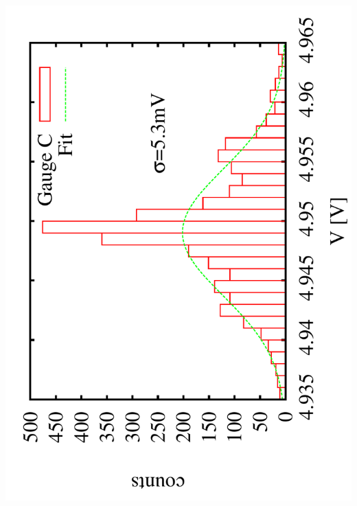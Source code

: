 \documentclass[a4paper,11pt]{book}
\begin{document}
 \includegraphics[scale=0.15,angle=-90]{image_ai_23e5.pdf}
\end{document}
